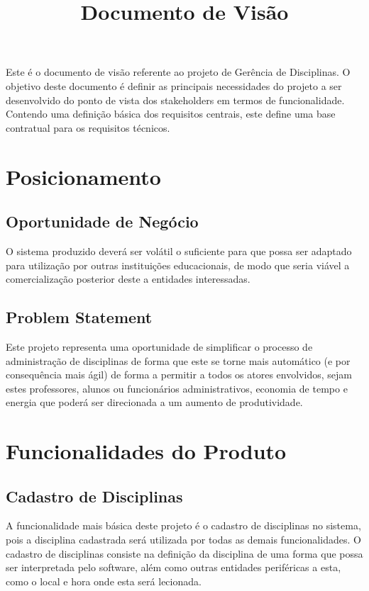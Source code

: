 \documentclass{article}
\title{Documento de Visão}
\begin{document}
\maketitle
Este é o documento de visão referente ao projeto de Gerência de Disciplinas. O objetivo deste documento é definir as principais necessidades do projeto a ser desenvolvido do ponto de vista dos stakeholders em termos de funcionalidade. Contendo uma definição básica dos requisitos centrais, este define uma base contratual para os requisitos técnicos.

\section{Posicionamento}

\subsection{Oportunidade de Negócio}
O sistema produzido deverá ser volátil o suficiente para que possa ser adaptado para utilização por outras instituições educacionais, de modo que seria viável a comercialização posterior deste a entidades interessadas.

\subsection{Problem Statement}
Este projeto representa uma oportunidade de simplificar o processo de administração de disciplinas de forma que este se torne mais automático (e por consequência mais ágil) de forma a permitir a todos os atores envolvidos, sejam estes professores, alunos ou funcionários administrativos, economia de tempo e energia que poderá ser direcionada a um aumento de produtividade.

\section{Funcionalidades do Produto}

\subsection{Cadastro de Disciplinas}
A funcionalidade mais básica deste projeto é o cadastro de disciplinas no sistema, pois a disciplina cadastrada será utilizada por todas as demais funcionalidades. O cadastro de disciplinas consiste na definição da disciplina de uma forma que possa ser interpretada pelo software, além como outras entidades periféricas a esta, como o local e hora onde esta será lecionada.
\end{document}
